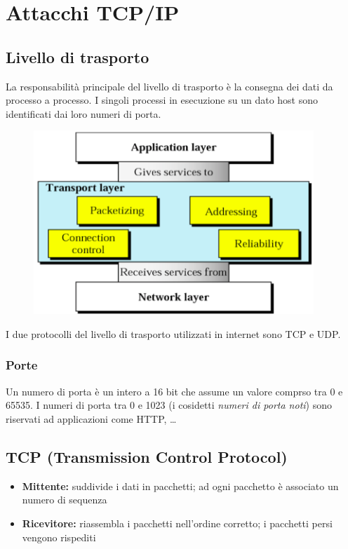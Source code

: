 \chapter{Attacchi TCP/IP}

\section{Livello di trasporto}
La responsabilità principale del livello di trasporto è la consegna 
dei dati da processo a processo. I singoli processi in esecuzione su un 
dato host sono identificati dai loro numeri di porta.

\begin{figure}[H]
    \centering
    \includegraphics[width=0.7\linewidth]{chapters/8/images/trasporto.png}
\end{figure}

\noindent I due protocolli del livello di trasporto utilizzati in internet 
sono TCP e UDP.

\subsection{Porte}
Un numero di porta è un intero a 16 bit che assume un valore comprso 
tra 0 e 65535. I numeri di porta tra 0 e 1023 (i cosidetti \textit{numeri di
porta noti}) sono riservati ad applicazioni come HTTP, \dots

\section{TCP (Transmission Control Protocol)}
\begin{itemize}
    \item \textbf{Mittente:} suddivide i dati in pacchetti; ad ogni pacchetto è associato un numero di sequenza
    \item \textbf{Ricevitore:} riassembla i pacchetti nell'ordine corretto; i pacchetti persi vengono rispediti
\end{itemize}

